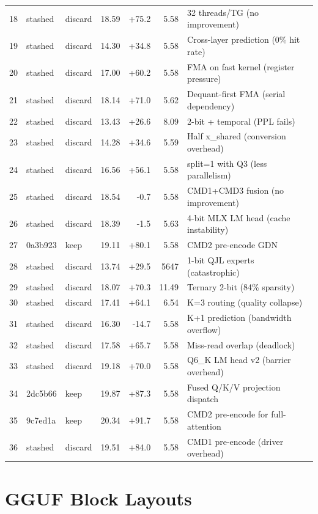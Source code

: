 \documentclass[11pt,twocolumn]{article}
\begin{document}
\begin{table}[h]
\begin{tabular}{rllrrrp{6cm}}
18 & stashed & discard & 18.59 & +75.2 & 5.58 & 32 threads/TG (no improvement) \\
19 & stashed & discard & 14.30 & +34.8 & 5.58 & Cross-layer prediction (0\% hit rate) \\
20 & stashed & discard & 17.00 & +60.2 & 5.58 & FMA on fast kernel (register pressure) \\
21 & stashed & discard & 18.14 & +71.0 & 5.62 & Dequant-first FMA (serial dependency) \\
22 & stashed & discard & 13.43 & +26.6 & 8.09 & 2-bit + temporal (PPL fails) \\
23 & stashed & discard & 14.28 & +34.6 & 5.59 & Half x\_shared (conversion overhead) \\
24 & stashed & discard & 16.56 & +56.1 & 5.58 & split=1 with Q3 (less parallelism) \\
25 & stashed & discard & 18.54 & -0.7 & 5.58 & CMD1+CMD3 fusion (no improvement) \\
26 & stashed & discard & 18.39 & -1.5 & 5.63 & 4-bit MLX LM head (cache instability) \\
27 & 0a3b923 & keep & 19.11 & +80.1 & 5.58 & CMD2 pre-encode GDN \\
28 & stashed & discard & 13.74 & +29.5 & 5647 & 1-bit QJL experts (catastrophic) \\
29 & stashed & discard & 18.07 & +70.3 & 11.49 & Ternary 2-bit (84\% sparsity) \\
30 & stashed & discard & 17.41 & +64.1 & 6.54 & K=3 routing (quality collapse) \\
31 & stashed & discard & 16.30 & -14.7 & 5.58 & K+1 prediction (bandwidth overflow) \\
32 & stashed & discard & 17.58 & +65.7 & 5.58 & Miss-read overlap (deadlock) \\
33 & stashed & discard & 19.18 & +70.0 & 5.58 & Q6\_K LM head v2 (barrier overhead) \\
34 & 2dc5b66 & keep & 19.87 & +87.3 & 5.58 & Fused Q/K/V projection dispatch \\
35 & 9c7ed1a & keep & 20.34 & +91.7 & 5.58 & CMD2 pre-encode for full-attention \\
36 & stashed & discard & 19.51 & +84.0 & 5.58 & CMD1 pre-encode (driver overhead) \\
\bottomrule
\end{tabular}
\end{table}

\section{GGUF Block Layouts}
\end{document}
